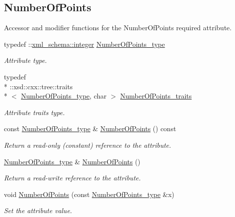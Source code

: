 \subsection*{Number\+Of\+Points}
\label{_amgrp38600d7fb1ccb3e7ee12b901540b4f7d}%
Accessor and modifier functions for the Number\+Of\+Points required attribute. \begin{DoxyCompactItemize}
\item 
typedef \+::\hyperlink{namespacexml__schema_aaaea7c8ce4dfbe26cc52c91c29c97b7c}{xml\+\_\+schema\+::integer} \hyperlink{classPieceUnstructuredGrid__t_a8df1cd0d138d990e166d325ceed9a660}{Number\+Of\+Points\+\_\+type}
\begin{DoxyCompactList}\small\item\em Attribute type. \end{DoxyCompactList}\item 
typedef \\*
\+::xsd\+::cxx\+::tree\+::traits\\*
$<$ \hyperlink{classPieceUnstructuredGrid__t_a8df1cd0d138d990e166d325ceed9a660}{Number\+Of\+Points\+\_\+type}, char $>$ \hyperlink{classPieceUnstructuredGrid__t_acdfbb1dc264a5a48bcc6d4aa815db003}{Number\+Of\+Points\+\_\+traits}
\begin{DoxyCompactList}\small\item\em Attribute traits type. \end{DoxyCompactList}\item 
const \hyperlink{classPieceUnstructuredGrid__t_a8df1cd0d138d990e166d325ceed9a660}{Number\+Of\+Points\+\_\+type} \& \hyperlink{classPieceUnstructuredGrid__t_a6fe4a92f59d9a837e046bf3d51e79b33}{Number\+Of\+Points} () const 
\begin{DoxyCompactList}\small\item\em Return a read-\/only (constant) reference to the attribute. \end{DoxyCompactList}\item 
\hyperlink{classPieceUnstructuredGrid__t_a8df1cd0d138d990e166d325ceed9a660}{Number\+Of\+Points\+\_\+type} \& \hyperlink{classPieceUnstructuredGrid__t_adadae535c3c291dc01dd0be3315d9dbc}{Number\+Of\+Points} ()
\begin{DoxyCompactList}\small\item\em Return a read-\/write reference to the attribute. \end{DoxyCompactList}\item 
void \hyperlink{classPieceUnstructuredGrid__t_a3e4e5defa42f9ecebb2016ca1d207700}{Number\+Of\+Points} (const \hyperlink{classPieceUnstructuredGrid__t_a8df1cd0d138d990e166d325ceed9a660}{Number\+Of\+Points\+\_\+type} \&x)
\begin{DoxyCompactList}\small\item\em Set the attribute value. \end{DoxyCompactList}\end{DoxyCompactItemize}
